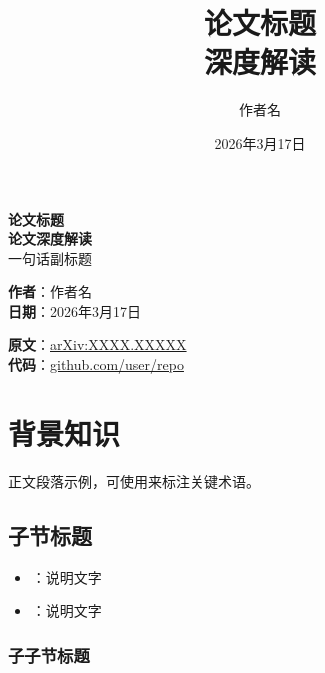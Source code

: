 \documentclass{ModernColorful}
\title{\textbf{论文标题\\深度解读}}
\author{作者名}
\date{2026年3月17日}
\begin{document}
\begin{titlepage}
  \AddTitlePageLogo
  \thispagestyle{empty}
  \centering
  \vspace*{2cm}

  \begin{titlebox}
    \centering
    {\LARGE\bfseries\color{primaryblue} 论文标题}\\[10pt]
    {\Large\bfseries 论文深度解读}\\[15pt]
    {\normalsize 一句话副标题}
  \end{titlebox}

  \vspace{2cm}

  {\large\color{textgray}
  \textbf{作者}：作者名\\[5pt]
  \textbf{日期}：2026年3月17日
  }

  \vfill

  \begin{infobox}[论文信息]
    \centering
    \textbf{原文}：\href{https://arxiv.org/abs/XXXX.XXXXX}{arXiv:XXXX.XXXXX}\\
    \textbf{代码}：\href{https://github.com/user/repo}{github.com/user/repo}
  \end{infobox}
\end{titlepage}

\tableofcontents
\newpage

\section{背景知识}

正文段落示例，可使用来标注关键术语。

\subsection{子节标题}

\begin{warningbox}[注意事项]
  \begin{itemize}
    \item {}：说明文字
    \item {}：说明文字
  \end{itemize}
\end{warningbox}

\subsubsection{子子节标题}
\end{document}
